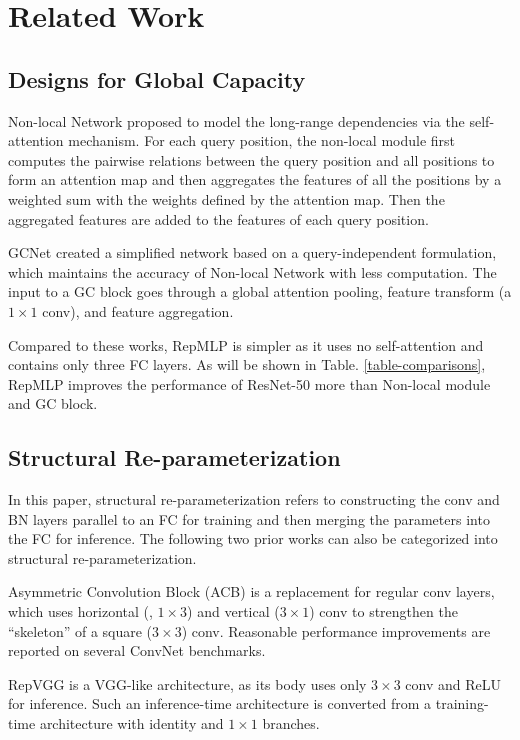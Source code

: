 \documentclass[10pt,twocolumn,letterpaper]{article}
\begin{document}
\section{Related Work}

\subsection{Designs for Global Capacity}

Non-local Network \cite{wang2018non} proposed to model the long-range dependencies via the self-attention mechanism. For each query position, the non-local module first computes the pairwise relations between the query position and all positions to form an attention map and then aggregates the features of all the positions by a weighted sum with the weights defined by the attention map. Then the aggregated features are added to the features of each query position.

GCNet \cite{cao2019gcnet} created a simplified network based on a query-independent formulation, which maintains the accuracy of Non-local Network with less computation. The input to a GC block goes through a global attention pooling, feature transform (a $1\times1$ conv), and feature aggregation. 

Compared to these works, RepMLP is simpler as it uses no self-attention and contains only three FC layers. As will be shown in Table. \ref{table-comparisons}, RepMLP improves the performance of ResNet-50 more than Non-local module and GC block.


\subsection{Structural Re-parameterization}

In this paper, structural re-parameterization refers to constructing the conv and BN layers parallel to an FC for training and then merging the parameters into the FC for inference. The following two prior works can also be categorized into structural re-parameterization.

Asymmetric Convolution Block (ACB) \cite{ding2019acnet} is a replacement for regular conv layers, which uses horizontal (\eg, $1\times3$) and vertical ($3\times1$) conv to strengthen the ``skeleton'' of a square ($3\times3$) conv. Reasonable performance improvements are reported on several ConvNet benchmarks.



RepVGG \cite{ding2021repvgg} is a VGG-like architecture, as its body uses only $3\times3$ conv and ReLU for inference. Such an inference-time architecture is converted from a training-time architecture with identity and $1\times1$ branches.
\end{document}
